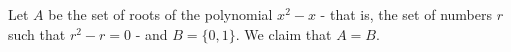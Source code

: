 \begin{ex}
%	
%	
%	
%	
%	
%	
%	
%	
%	
%	
%	
%	
%	
Let $A$ be the set of roots of the polynomial $x^2-x$ - that is, the set of numbers $r$ such that $r^2-r=0$ - and $B=\{0,1\}$. We claim that $A=B$.


\end{ex}
